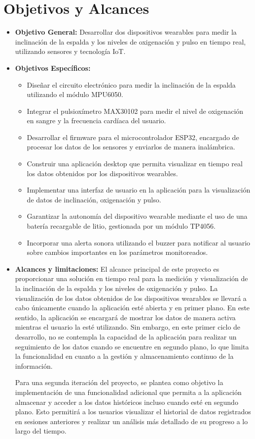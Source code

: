 \documentclass[manuscript,screen,review]{acmart}
\begin{document}
\section{Objetivos y Alcances}
\begin{itemize}
    \item \textbf{Objetivo General:} Desarrollar dos dispositivos wearables para medir la inclinación de la espalda y los niveles de oxigenación y pulso en tiempo real, utilizando sensores y tecnología IoT.
    
    \item \textbf{Objetivos Específicos:}
    \begin{itemize}
        \item Diseñar el circuito electrónico para medir la inclinación de la espalda utilizando el módulo MPU6050.
        \item Integrar el pulsioxímetro MAX30102 para medir el nivel de oxigenación en sangre y la frecuencia cardíaca del usuario.
        \item Desarrollar el firmware para el microcontrolador ESP32, encargado de procesar los datos de los sensores y enviarlos de manera inalámbrica.
        \item Construir una aplicación desktop que permita visualizar en tiempo real los datos obtenidos por los dispositivos wearables.
        \item Implementar una interfaz de usuario en la aplicación para la visualización de datos de inclinación, oxigenación y pulso.
        \item Garantizar la autonomía del dispositivo wearable mediante el uso de una batería recargable de litio, gestionada por un módulo TP4056.
        \item Incorporar una alerta sonora utilizando el buzzer para notificar al usuario sobre cambios importantes en los parámetros monitoreados.
    \end{itemize}

    \item \textbf{Alcances y limitaciones:}
    El alcance principal de este proyecto es proporcionar una solución en tiempo real para la medición y visualización de la inclinación de la espalda y los niveles de oxigenación y pulso. La visualización de los datos obtenidos de los dispositivos wearables se llevará a cabo únicamente cuando la aplicación esté abierta y en primer plano. En este sentido, la aplicación se encargará de mostrar los datos de manera activa mientras el usuario la esté utilizando. Sin embargo, en este primer ciclo de desarrollo, no se contempla la capacidad de la aplicación para realizar un seguimiento de los datos cuando se encuentre en segundo plano, lo que limita la funcionalidad en cuanto a la gestión y almacenamiento continuo de la información.

    Para una segunda iteración del proyecto, se plantea como objetivo la implementación de una funcionalidad adicional que permita a la aplicación almacenar y acceder a los datos históricos incluso cuando esté en segundo plano. Esto permitirá a los usuarios visualizar el historial de datos registrados en sesiones anteriores y realizar un análisis más detallado de su progreso a lo largo del tiempo.
\end{itemize} 
\end{document}
